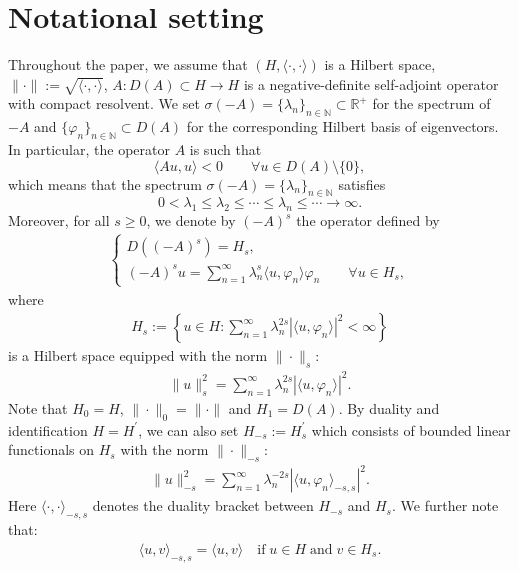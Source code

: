\documentclass[reqno]{amsart}
\numberwithin{equation}{section}
\begin{document}
\section*{Notational setting}
Throughout the paper, we assume that $(H,\langle \cdot,\cdot \rangle)$ is a Hilbert space, $\|\cdot\|:=\sqrt{\langle \cdot,\cdot \rangle}$, $A:D(A)\subset H\rightarrow H$ is a negative-definite self-adjoint operator with compact resolvent.
We set $\sigma(-A) = \{\lambda_n\}_{n\in \mathbb{N}}\subset \mathbb{R}^{+}$ for the spectrum of $-A$ and $\{\varphi_n\}_{n\in \mathbb{N}}\subset D(A)$ for the corresponding Hilbert basis of eigenvectors. In particular, the operator $A$ is such that $$\langle Au,u \rangle <0 \qquad \forall u\in D(A)\setminus \{0\},$$
which means that the spectrum $\sigma(-A) = \{\lambda_n\}_{n\in \mathbb{N}}$ satisfies
$$0<\lambda_1 \le \lambda_2 \le \cdots \le \lambda_n \le \cdots\to \infty.$$
Moreover, for all $s\ge 0$, we denote by $(-A)^s$ the operator defined by
\begin{align*}
\begin{cases}
    D((-A)^s)=H_s,\\
    (-A)^s u=\displaystyle\sum_{n=1}^{\infty}\lambda_{n}^s\langle u, \varphi_n \rangle \varphi_n \qquad \forall u\in H_s,
\end{cases}
\end{align*}
where
\begin{align}
	H_s:=\left\{u\in H\colon \sum_{n=1}^{\infty}\lambda_{n}^{2s}|\langle u, \varphi_n \rangle|^2 <\infty\right\}
\end{align}
is a Hilbert space equipped with the norm $\|\cdot\|_s$:
\begin{align}
	\|u\|_s^2=\sum_{n=1}^{\infty}\lambda_{n}^{2s}|\langle u, \varphi_n \rangle|^2.
\end{align}
Note that $H_0=H$, $\|\cdot\|_0=\|\cdot\|$ and $H_1=D(A)$. By duality and identification $H=H^{\prime}$, we can also set $H_{-s}:=H_s^{\prime}$ which consists
of bounded linear functionals on $H_s$ with the norm $\|\cdot\|_{-s}$:
\begin{align}
	\|u\|_{-s}^2=\sum_{n=1}^{\infty}\lambda_{n}^{-2s}|\langle u, \varphi_n \rangle_{-s,s}|^2.
\end{align}
Here $\langle\cdot,\cdot\rangle_{-s,s}$ denotes the duality bracket between $H_{-s}$ and $H_s$. We further note that:
\begin{align}
	\langle u, v\rangle_{-s,s}=\langle u, v\rangle\quad \mbox{if}\; u\in H\;\mbox{and}\; v\in H_s.
\end{align}
\end{document}
